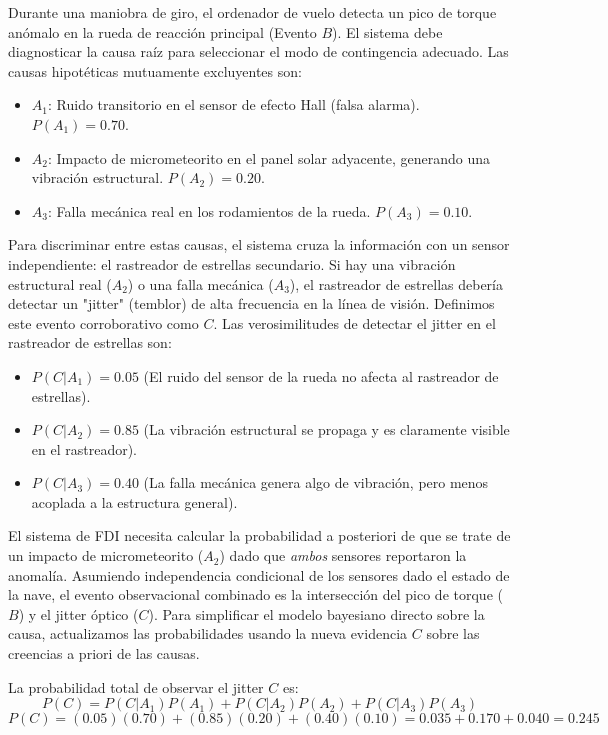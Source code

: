 Durante una maniobra de giro, el ordenador de vuelo detecta un pico de torque anómalo en la rueda de reacción principal (Evento $B$). El sistema debe diagnosticar la causa raíz para seleccionar el modo de contingencia adecuado. Las causas hipotéticas mutuamente excluyentes son:
\begin{itemize}
    \item $A_1$: Ruido transitorio en el sensor de efecto Hall (falsa alarma). $P(A_1) = 0.70$.
    \item $A_2$: Impacto de micrometeorito en el panel solar adyacente, generando una vibración estructural. $P(A_2) = 0.20$.
    \item $A_3$: Falla mecánica real en los rodamientos de la rueda. $P(A_3) = 0.10$.
\end{itemize}

Para discriminar entre estas causas, el sistema cruza la información con un sensor independiente: el rastreador de estrellas secundario. Si hay una vibración estructural real ($A_2$) o una falla mecánica ($A_3$), el rastreador de estrellas debería detectar un "jitter" (temblor) de alta frecuencia en la línea de visión. Definimos este evento corroborativo como $C$. Las verosimilitudes de detectar el jitter en el rastreador de estrellas son:
\begin{itemize}
    \item $P(C | A_1) = 0.05$ (El ruido del sensor de la rueda no afecta al rastreador de estrellas).
    \item $P(C | A_2) = 0.85$ (La vibración estructural se propaga y es claramente visible en el rastreador).
    \item $P(C | A_3) = 0.40$ (La falla mecánica genera algo de vibración, pero menos acoplada a la estructura general).
\end{itemize}

El sistema de FDI necesita calcular la probabilidad a posteriori de que se trate de un impacto de micrometeorito ($A_2$) dado que \textit{ambos} sensores reportaron la anomalía. Asumiendo independencia condicional de los sensores dado el estado de la nave, el evento observacional combinado es la intersección del pico de torque ($B$) y el jitter óptico ($C$). Para simplificar el modelo bayesiano directo sobre la causa, actualizamos las probabilidades usando la nueva evidencia $C$ sobre las creencias a priori de las causas.

La probabilidad total de observar el jitter $C$ es:
$$ P(C) = P(C | A_1)P(A_1) + P(C | A_2)P(A_2) + P(C | A_3)P(A_3) $$
$$ P(C) = (0.05)(0.70) + (0.85)(0.20) + (0.40)(0.10) = 0.035 + 0.170 + 0.040 = 0.245 $$

